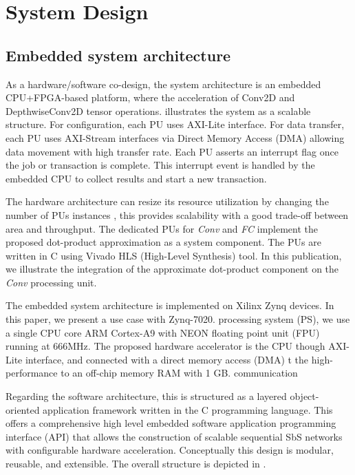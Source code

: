 \section{System Design}
\label{sec:system_design}
\subsection{Embedded system architecture}
As a hardware/software co-design, the system architecture is an embedded CPU+FPGA-based platform, where the acceleration of Conv2D and DepthwiseConv2D tensor operations.  illustrates the system  as a scalable structure. For  configuration, each PU uses AXI-Lite interface. For data transfer, each PU uses AXI-Stream interfaces via Direct Memory Access (DMA) allowing data movement with high transfer rate. Each PU asserts an interrupt flag once the job or transaction is complete. This interrupt event is handled by the embedded CPU to collect results and start a new transaction.

The hardware architecture can resize its resource utilization by changing the number of PUs instances , this provides scalability with a good trade-off between area and throughput. The dedicated PUs for \emph{Conv} and \emph{FC} implement the proposed dot-product approximation as a system component. The PUs are written in C using Vivado HLS (High-Level Synthesis) tool. In this publication, we illustrate the integration of the approximate dot-product component on the \emph{Conv} processing unit.


The embedded system architecture is implemented on Xilinx Zynq devices. In this paper, we present a use case with Zynq-7020.  processing system (PS), we use a single CPU core ARM Cortex-A9 with NEON floating point unit (FPU) running at 666MHz. The proposed hardware accelerator is  the CPU though AXI-Lite interface, and connected with a direct memory access (DMA) t the high-performance to an off-chip memory RAM with 1 GB. communication

Regarding the software architecture, this is structured as a
layered object-oriented application framework written in the C programming language. This offers a comprehensive high level embedded software application programming interface (API) that allows the construction of scalable sequential SbS networks with configurable hardware acceleration. Conceptually this design is modular, reusable, and extensible. The overall structure is depicted in .


